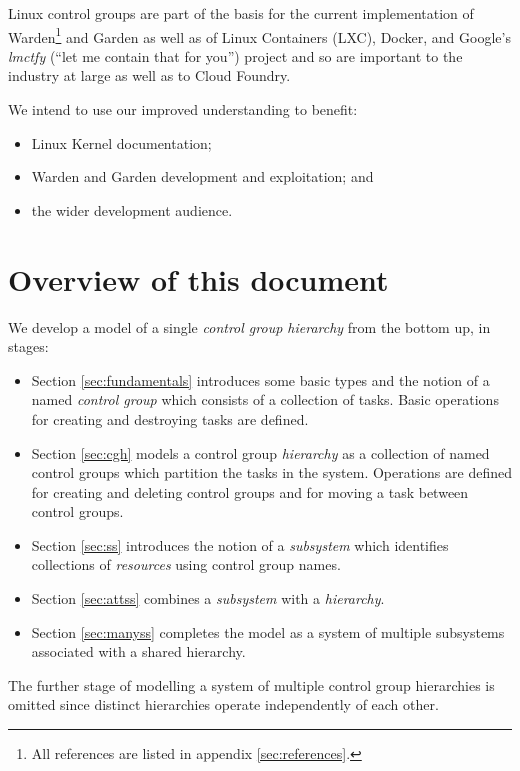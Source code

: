 \documentclass[a4paper,twoside,12pt]{article}
\begin{document}
Linux control groups are part of the basis for the current implementation of Warden\cite{warden}\footnote{All references are listed in appendix \ref{sec:references}.} and 
Garden\cite{garden} as well as of Linux Containers (LXC), Docker, and Google's
\emph{lmctfy} (``let me contain that for you'') project and so are important to the industry at large as well as to Cloud
Foundry.

We intend to use our improved understanding to benefit:
\begin{itemize}
\item Linux Kernel documentation;
\item Warden\cite{warden} and Garden\cite{garden} development and exploitation; and
\item the wider development audience.
\end{itemize}

\section{Overview of this document}

We develop a model of a single \emph{control group hierarchy} from the bottom up, in stages:
\begin{itemize}

\item Section \ref{sec:fundamentals} introduces some basic types and the notion of a named \emph{control group} which consists of a
collection of tasks. Basic operations for creating and destroying tasks are defined.

\item  Section \ref{sec:cgh} models a control group \emph{hierarchy} as a collection of named control groups which partition the tasks
in the system. Operations are defined for creating and deleting control groups and for moving a task between control groups.

\item Section \ref{sec:ss} introduces the notion of a \emph{subsystem} which identifies collections of \emph{resources} using control group names.

\item Section \ref{sec:attss} combines a \emph{subsystem} with a \emph{hierarchy}.

\item Section \ref{sec:manyss} completes the model as a system of multiple subsystems associated with a shared hierarchy.

\end{itemize}
The further stage of modelling a system of multiple control group hierarchies is omitted since distinct hierarchies operate independently of each other.
\end{document}

